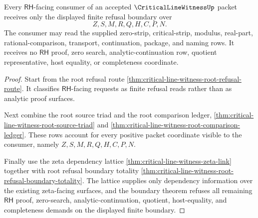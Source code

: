\begin{theorem}
\label{thm:critical-line-witness-root-rh-consumer-refusal}
Every $\mathsf{RH}$-facing consumer of an accepted $\CriticalLineWitnessUp$
packet receives only the displayed finite refusal boundary over
$$
Z,S,M,R,Q,H,C,P,N.
$$
The consumer may read the supplied zero-strip, critical-strip, modulus,
real-part, rational-comparison, transport, continuation, package, and naming
rows. It receives no $\mathsf{RH}$ proof, zero search, analytic-continuation
row, quotient representative, host equality, or completeness coordinate.
\end{theorem}
\begin{proof}
Start from the root refusal route
\autoref{thm:critical-line-witness-root-refusal-route}. It classifies
$\mathsf{RH}$-facing requests as finite refusal reads rather than as analytic
proof surfaces.

Next combine the root source triad and the root comparison ledger,
\autoref{thm:critical-line-witness-root-source-triad} and
\autoref{thm:critical-line-witness-root-comparison-ledger}. These rows account
for every positive packet coordinate visible to the consumer, namely
$Z,S,M,R,Q,H,C,P,N$.

Finally use the zeta dependency lattice
\autoref{thm:critical-line-witness-zeta-link} together with root refusal
boundary totality
\autoref{thm:critical-line-witness-root-refusal-boundary-totality}. The
lattice supplies only dependency information over the existing zeta-facing
surfaces, and the boundary theorem refuses all remaining $\mathsf{RH}$ proof,
zero-search, analytic-continuation, quotient, host-equality, and completeness
demands on the displayed finite boundary.
\end{proof}
